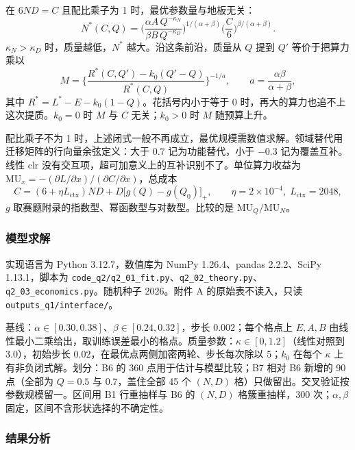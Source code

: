 在 $6ND=C$ 且配比乘子为 1 时，最优参数量与地板无关：
\begin{equation}
N^{*}(C,Q)
=\Biggl(\frac{\alpha A\,Q^{-\kappa_N}}{\beta B\,Q^{-\kappa_D}}\Biggr)^{1/(\alpha+\beta)}
\Biggl(\frac{C}{6}\Biggr)^{\beta/(\alpha+\beta)}.
\label{eq:q2nstar}
\end{equation}
$\kappa_N>\kappa_D$ 时，质量越低，$N^{*}$ 越大。沿这条前沿，质量从 $Q$ 提到 $Q'$ 等价于把算力乘以
\begin{equation}
M=\Biggl\{\frac{R^{*}(C,Q')-k_0(Q'-Q)}{R^{*}(C,Q)}\Biggr\}^{-1/a},\qquad
a=\frac{\alpha\beta}{\alpha+\beta},
\label{eq:q2M}
\end{equation}
其中 $R^{*}=L^{*}-E-k_0(1-Q)$。花括号内小于等于 0 时，再大的算力也追不上这次提质。$k_0=0$ 时 $M$ 与 $C$ 无关；$k_0>0$ 时 $M$ 随预算上升。

配比乘子不为 1 时，上述闭式一般不再成立，最优规模需数值求解。领域替代用迁移矩阵的行向量余弦定义：大于 $0.7$ 记为功能替代，小于 $-0.3$ 记为覆盖互补。线性 clr 没有交互项，超可加意义上的互补识别不了。单位算力收益为 $\mathrm{MU}_x=-(\partial L/\partial x)/(\partial C/\partial x)$，总成本
\[
C=(6+\eta L_{\mathrm{ctx}})ND+D\bigl[g(Q)-g(Q_0)\bigr]_+,\qquad
\eta=2\times 10^{-4},\; L_{\mathrm{ctx}}=2048,
\]
$g$ 取赛题附录的指数型、幂函数型与对数型。比较的是 $\mathrm{MU}_Q/\mathrm{MU}_N$。

\subsubsection{模型求解}

实现语言为 Python 3.12.7，数值库为 NumPy 1.26.4、pandas 2.2.2、SciPy 1.13.1，脚本为 \texttt{code\_q2/q2\_01\_fit.py}、\texttt{q2\_02\_theory.py}、\texttt{q2\_03\_economics.py}。随机种子 2026。附件 A 的原始表不读入，只读 \texttt{outputs\_q1/interface/}。

基线：$\alpha\in[0.30,0.38]$、$\beta\in[0.24,0.32]$，步长 $0.002$；每个格点上 $E,A,B$ 由线性最小二乘给出，取训练误差最小的格点。质量参数：$\kappa\in[0,1.2]$（线性对照到 $3.0$），初始步长 $0.02$，在最优点两侧加密两轮、步长每次除以 5；$k_0$ 在每个 $\kappa$ 上有非负闭式解。划分：B6 的 360 点用于估计与模型比较；B7 相对 B6 新增的 90 点（全部为 $Q=0.5$ 与 $0.7$，盖住全部 45 个 $(N,D)$ 格）只做留出。交叉验证按参数规模留一。区间用 B1 行重抽样与 B6 的 $(N,D)$ 格簇重抽样，300 次；$\alpha,\beta$ 固定，区间不含形状选择的不确定性。

\subsubsection{结果分析}

